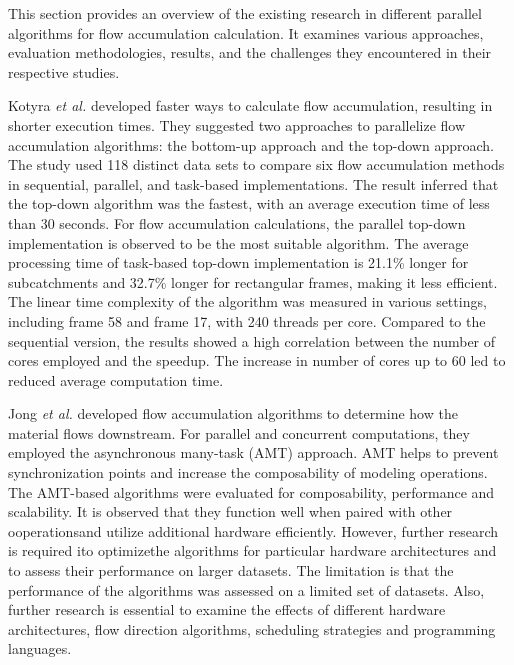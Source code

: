 \documentclass[journal, a4paper]{IEEEtran}
\begin{document}
	This section provides an overview of the existing research \cite{ KOTYRA2021104741, DEJONG2022105083, CHO2020104774, stojanovic2020accelerating, 10.1007/978-3-030-60939-9_16,KOTYRA2023105613, HUANG2022106} in different parallel algorithms for flow accumulation calculation. It examines various approaches, evaluation methodologies, results, and the challenges they encountered in their respective studies.
	
	Kotyra \textit{et al.} \cite{KOTYRA2021104741} developed faster ways to calculate flow accumulation, resulting in shorter execution times. They suggested two approaches to parallelize flow accumulation algorithms: the bottom-up approach and the top-down approach. The study used 118 distinct data sets to compare six flow accumulation methods in sequential, parallel, and task-based implementations. The result inferred that the top-down algorithm was the fastest, with an average execution time of less than 30 seconds. For flow accumulation calculations, the parallel top-down implementation is observed to be the most suitable algorithm. The average processing time of task-based top-down implementation is 21.1\% longer for subcatchments and 32.7\% longer for rectangular frames, making it less efficient. The linear time complexity of the algorithm was measured in various settings, including frame 58 and frame 17, with 240 threads per core. Compared to the sequential version, the results showed a high correlation between the number of cores employed and the speedup. The increase in number of cores up to 60 led to reduced average computation time.

	Jong \textit{et al.} \cite{DEJONG2022105083} developed flow accumulation algorithms to determine how the material flows downstream. For parallel and concurrent computations, they employed the asynchronous many-task (AMT) approach. AMT helps to prevent synchronization points and increase the composability of modeling operations. The AMT-based algorithms were evaluated for composability, performance and scalability. It is observed that they function well when paired with other ooperationsand utilize additional hardware efficiently. However, further research is required ito optimizethe algorithms for particular hardware architectures and to assess their performance on larger datasets. The limitation is that the performance of the algorithms was assessed on a limited set of datasets. Also, further research is essential to examine the effects of different hardware architectures, flow direction algorithms, scheduling strategies and programming languages.
	
\end{document}
